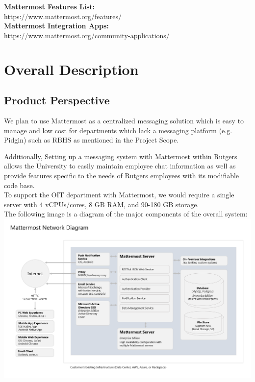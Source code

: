 \documentclass{scrreprt}
\begin{document}
\noindent
\textbf{Mattermost Features List:}\\
https://www.mattermost.org/features/\\

\noindent
\textbf{Mattermost Integration Apps:}\\
https://www.mattermost.org/community-applications/\\


\chapter{Overall Description}

\section{Product Perspective}


We plan to use Mattermost as a centralized messaging solution which is easy to
manage and low cost for departments which lack a messaging platform (e.g.
Pidgin) such as RBHS as mentioned in the Project Scope.

Additionally, Setting up a messaging system with Mattermost within Rutgers allows the
University to easily maintain employee chat information as well as provide
features specific to the needs of Rutgers employees with its modifiable code
base.\\

To support the OIT department with Mattermost, we would require a single server
with 4 vCPUs/cores, 8 GB RAM, and 90-180 GB storage.\\

The following image is a diagram of the major components of the overall system:
\includegraphics[scale=0.5, width=\textwidth]{mattermost-diagram.png}
\end{document}
